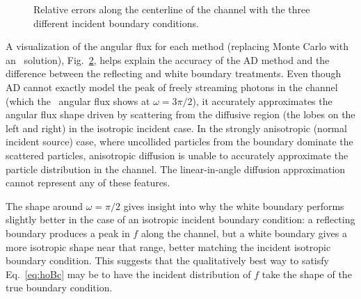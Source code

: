 \begin{figure}[htb]
  \centering
  \centering\small
  \hspace{-.25in}%
  
  \caption{Relative errors along the centerline of the channel with the three
  different incident boundary conditions.}
  \label{fig:adbcRelErr}
\end{figure}

A visualization of the angular flux for each method (replacing Monte Carlo with
an \SN\ solution), Fig.~\ref{fig:bcChannelIsotropicAngular}, helps explain the
accuracy
of the AD method and the difference between the reflecting and white boundary
treatments. Even though AD cannot exactly model the peak of freely streaming
photons in the channel (which the \SN\ angular flux shows at $\omega=3\pi/2$),
it accurately approximates the angular flux shape driven by scattering from the
diffusive region (the lobes on the left and right) in the isotropic incident
case. In the strongly anisotropic (normal incident source) case, where
uncollided particles from the boundary dominate the scattered particles,
anisotropic diffusion is unable to accurately approximate the particle
distribution in the channel.
The linear-in-angle diffusion approximation cannot represent any of these
features.

\begin{figure}[htb]
  \centering\small
  \subfloat[Isotropic]{%
  \vspace{-.25in}%
  }%
  \subfloat[Normal]{%
  \vspace{-.25in}%
  }%
  \label{fig:bcChannelIsotropicAngular}
\end{figure}

The shape around $\omega=\pi/2$ gives insight into why the white boundary
performs slightly better in the case of an isotropic incident boundary
condition: a reflecting boundary produces a peak in $f$
along the channel, but a white boundary gives a more isotropic shape near that
range, better matching the incident isotropic boundary condition. This suggests
that the qualitatively best way to satisfy Eq.~\eqref{eq:hoBc} may be
to have the incident distribution of $f$ take the shape of the true boundary
condition.

